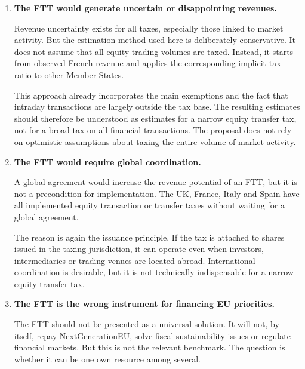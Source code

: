 \documentclass[../main]{subfiles}
\begin{document}
\begin{enumerate}
    That said, the quality of the collection mechanism matters. The French experience also shows that transparency, access to data and administrative control are important. A European own resource should therefore be designed with clear reporting obligations and strong cooperation between tax authorities, market supervisors and settlement infrastructures.

    \item \textbf{The FTT would generate uncertain or disappointing revenues.}

    Revenue uncertainty exists for all taxes, especially those linked to market activity. But the estimation method used here is deliberately conservative. It does not assume that all equity trading volumes are taxed. Instead, it starts from observed French revenue and applies the corresponding implicit tax ratio to other Member States.

    This approach already incorporates the main exemptions and the fact that intraday transactions are largely outside the tax base. The resulting estimates should therefore be understood as estimates for a narrow equity transfer tax, not for a broad tax on all financial transactions. The proposal does not rely on optimistic assumptions about taxing the entire volume of market activity.

    \item \textbf{The FTT would require global coordination.}

    A global agreement would increase the revenue potential of an FTT, but it is not a precondition for implementation. The UK, France, Italy and Spain have all implemented equity transaction or transfer taxes without waiting for a global agreement.

    The reason is again the issuance principle. If the tax is attached to shares issued in the taxing jurisdiction, it can operate even when investors, intermediaries or trading venues are located abroad. International coordination is desirable, but it is not technically indispensable for a narrow equity transfer tax.

    \item \textbf{The FTT is the wrong instrument for financing EU priorities.}

    The FTT should not be presented as a universal solution. It will not, by itself, repay NextGenerationEU, solve fiscal sustainability issues or regulate financial markets. But this is not the relevant benchmark. The question is whether it can be one own resource among several.


\end{enumerate}
\end{document}
